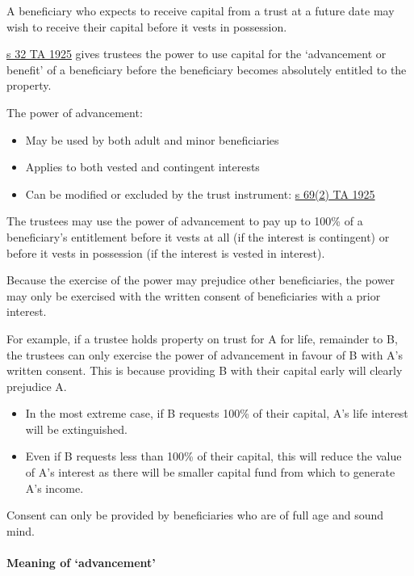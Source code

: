 \documentclass[
]{article}
\providecommand{\tightlist}{%
  \setlength{\itemsep}{0pt}\setlength{\parskip}{0pt}}
\begin{document}
A beneficiary who expects to receive capital from a trust at a future
date may wish to receive their capital before it vests in possession.

\href{https://www.legislation.gov.uk/ukpga/Geo5/15-16/19/section/32}{s
32 TA 1925} gives trustees the power to use capital for the `advancement
or benefit' of a beneficiary before the beneficiary becomes absolutely
entitled to the property.

The power of advancement:

\begin{itemize}
\tightlist
\item
  May be used by both adult and minor beneficiaries
\item
  Applies to both vested and contingent interests
\item
  Can be modified or excluded by the trust instrument:
  \href{https://www.legislation.gov.uk/ukpga/Geo5/15-16/19/section/69}{s
  69(2) TA 1925}
\end{itemize}

The trustees may use the power of advancement to pay up to 100\% of a
beneficiary's entitlement before it vests at all (if the interest is
contingent) or before it vests in possession (if the interest is vested
in interest).

Because the exercise of the power may prejudice other beneficiaries, the
power may only be exercised with the written consent of beneficiaries
with a prior interest.

For example, if a trustee holds property on trust for A for life,
remainder to B, the trustees can only exercise the power of advancement
in favour of B with A's written consent. This is because providing B
with their capital early will clearly prejudice A.

\begin{itemize}
\tightlist
\item
  In the most extreme case, if B requests 100\% of their capital, A's
  life interest will be extinguished.
\item
  Even if B requests less than 100\% of their capital, this will reduce
  the value of A's interest as there will be smaller capital fund from
  which to generate A's income.
\end{itemize}

Consent can only be provided by beneficiaries who are of full age and
sound mind.

\hypertarget{meaning-of-advancement}{%
\paragraph{Meaning of `advancement'}\label{meaning-of-advancement}}
\end{document}
